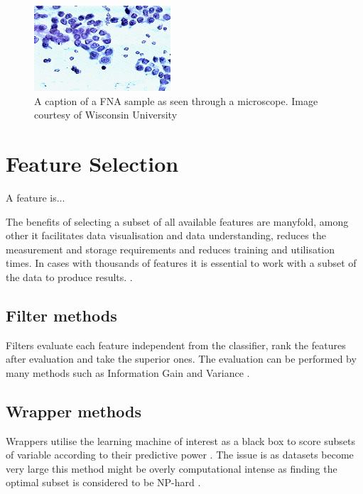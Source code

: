 \begin{figure}[ht!]
  \centering
  \includegraphics[]{images/fna_nuclei.png}
  \caption{A caption of a FNA sample as seen through a microscope. Image courtesy of Wisconsin University}
  \label{fig:fna_nuclei}
\end{figure}



\section{Feature Selection}

A feature is...

The benefits of selecting a subset of all available features are manyfold, among other it facilitates data visualisation and data understanding, reduces the measurement and storage requirements and reduces training and utilisation times. In cases with thousands of features it is essential to work with a subset of the data to produce results. \parencite{guyon2003}.


\subsection{Filter methods} %

Filters evaluate each feature independent from the classifier, rank the features after evaluation and take the superior ones. The evaluation can be performed by many methods such as Information Gain and Variance \parencite{guyon2003}.


\subsection{Wrapper methods} %

Wrappers utilise the learning machine of interest as a black box to score subsets of variable according to their predictive power \parencite{guyon2003}. The issue is as datasets become very large this method might be overly computational intense as finding the optimal subset is considered to be NP-hard \parencite{amaldi1998}.


